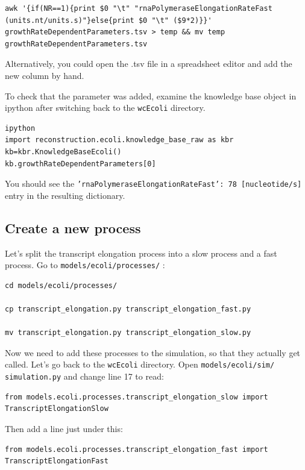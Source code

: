 \documentclass[12pt]{article}
\begin{document}
\begin{lstlisting}
awk '{if(NR==1){print $0 "\t" "rnaPolymeraseElongationRateFast (units.nt/units.s)"}else{print $0 "\t" ($9*2)}}' growthRateDependentParameters.tsv > temp && mv temp growthRateDependentParameters.tsv  
\end{lstlisting}

Alternatively, you could open the .tsv file in a spreadsheet editor and add the new column by hand.

To check that the parameter was added, examine the knowledge base object in ipython after switching back to the \texttt{wcEcoli} directory.

\lstset{language=Python}
\begin{lstlisting}
ipython
import reconstruction.ecoli.knowledge_base_raw as kbr
kb=kbr.KnowledgeBaseEcoli()
kb.growthRateDependentParameters[0]
\end{lstlisting}

You should see the \texttt{'rnaPolymeraseElongationRateFast': 78 [nucleotide/s]} entry in the resulting dictionary.

\subsection{Create a new process}

Let's split the transcript elongation process into a slow process and a fast process. Go to \texttt{models/ecoli/processes/} :

\lstset{language=bash}
\begin{lstlisting}
cd models/ecoli/processes/

cp transcript_elongation.py transcript_elongation_fast.py

mv transcript_elongation.py transcript_elongation_slow.py
\end{lstlisting}

Now we need to add these processes to the simulation, so that they actually get called. Let's go back to the \texttt{wcEcoli} directory. Open \texttt{models/ecoli/sim/ \allowbreak simulation.py} and change line 17 to read: 

\lstset{language=Python}
\begin{lstlisting}
from models.ecoli.processes.transcript_elongation_slow import TranscriptElongationSlow
\end{lstlisting}

Then add a line just under this:

\begin{lstlisting}
from models.ecoli.processes.transcript_elongation_fast import TranscriptElongationFast
\end{lstlisting}
\end{document}
